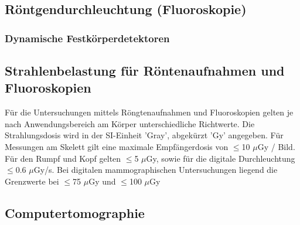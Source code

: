 
\subsection{Röntgendurchleuchtung (Fluoroskopie)}
\label{sec:Fluoroskopie}
\subsubsection{Dynamische Festkörperdetektoren}
\label{subsubsec:Festkörperdetektoren}




\subsection{Strahlenbelastung für Röntenaufnahmen und Fluoroskopien}
\label{subsec:Strahlenbelastung}

Für die Untersuchungen mittels Röngtenaufnahmen und Fluoroskopien gelten je nach Anwendungsbereich am Körper unterschiedliche 
Richtwerte. Die Strahlungsdosis wird in der SI-Einheit 'Gray', abgekürzt 'Gy' angegeben. Für Messungen am Skelett gilt eine maximale
Empfängerdosis von $\leq$10 $\mu$Gy / Bild. Für den Rumpf und Kopf gelten $\leq$5 $\mu$Gy, sowie für die digitale Durchleuchtung $\leq$0.6 
 $\mu$Gy/s. Bei digitalen mammographischen Untersuchungen liegend die Grenzwerte bei $\leq$75 $\mu$Gy und $\leq$100 $\mu$Gy




\subsection{Computertomographie}
\label{sec:CT}





